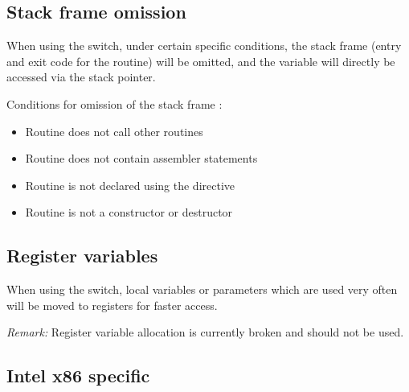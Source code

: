 \documentclass{report}
\begin{document}
\subsection{ Stack frame omission }

When using the  switch, under certain specific conditions,
the stack frame (entry and exit code for the routine) will be omitted, and
the variable will directly be accessed via the stack pointer.

Conditions for omission of the stack frame :

\begin{itemize}
\item Routine does not call other routines
\item Routine does not contain assembler statements
\item Routine is not declared using the  directive
\item Routine is not a constructor or destructor
\end{itemize}

\subsection{ Register variables }

When using the  switch, local variables or parameters
which are used very often will be moved to registers for faster
access.

\emph{ Remark: } Register variable allocation is currently
broken and should not be used.

\subsection{ Intel x86 specific }
\end{document}
